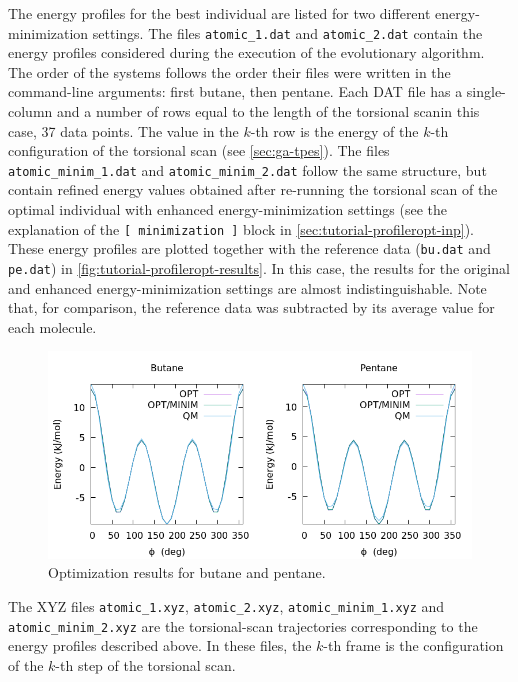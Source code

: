 \documentclass[10pt,a4paper,openany]{memoir}
\numberwithin{equation}{section}
\begin{document}
The energy profiles for the best individual are listed for two
different energy-minimization settings. The files
\texttt{atomic\_1.dat} and \texttt{atomic\_2.dat} contain the energy
profiles considered during the execution of the evolutionary
algorithm.  The order of the systems follows the order their files
were written in the command-line arguments: first butane, then
pentane. Each DAT file has a single-column and a number of rows equal
to the length of the torsional scan\textemdash{}in this case, 37 data
points. The value in the $k$-th row is the energy of the $k$-th
configuration of the torsional scan (see \autoref{sec:ga-tpes}).  The
files \texttt{atomic\_minim\_1.dat} and \texttt{atomic\_minim\_2.dat}
follow the same structure, but contain refined energy values obtained
after re-running the torsional scan of the optimal individual with
enhanced energy-minimization settings (see the explanation of the
\texttt{[~minimization~]} block in
\autoref{sec:tutorial-profileropt-inp}). These energy profiles are
plotted together with the reference data (\texttt{bu.dat} and
\texttt{pe.dat}) in \autoref{fig:tutorial-profileropt-results}.  In
this case, the results for the original and enhanced
energy-minimization settings are almost indistinguishable.  Note that,
for comparison, the reference data was subtracted by its average value
for each molecule.

\begin{figure}[tb]
  \centering
  \includegraphics[width=.8\textwidth]{opt-results}
  \caption{Optimization results for butane and pentane.}
  \label{fig:tutorial-profileropt-results}
\end{figure}

The XYZ files \texttt{atomic\_1.xyz}, \texttt{atomic\_2.xyz},
\texttt{atomic\_minim\_1.xyz} and \texttt{atomic\_minim\_2.xyz} are
the torsional-scan trajectories corresponding to the energy profiles
described above. In these files, the $k$-th frame is the configuration
of the $k$-th step of the torsional scan.
\end{document}
